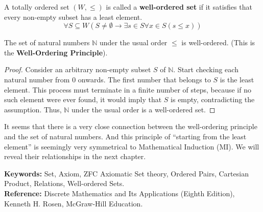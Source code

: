 \begin{definition}
A totally ordered set $(W, \le)$ is called a \textbf{well-ordered set} if it satisfies that every non-empty subset has a least element.
$$ \forall S \subseteq W (S \ne \emptyset \to \exists s \in S \forall x \in S (s \le x)) $$
\end{definition}

\begin{theorem}
The set of natural numbers $\mathbb{N}$ under the usual order $\le$ is well-ordered. (This is the \textbf{Well-Ordering Principle}).
\end{theorem}
\begin{proof}
Consider an arbitrary non-empty subset $S$ of $\mathbb{N}$. Start checking each natural number from 0 onwards. The first number that belongs to $S$ is the least element. This process must terminate in a finite number of steps, because if no such element were ever found, it would imply that $S$ is empty, contradicting the assumption. Thus, $\mathbb{N}$ under the usual order is a well-ordered set.
\end{proof}

It seems that there is a very close connection between the well-ordering principle and the set of natural numbers. And this principle of “starting from the least element” is seemingly very symmetrical to Mathematical Induction (MI). We will reveal their relationships in the next chapter.

\noindent
\textbf{Keywords:} Set, Axiom, ZFC Axiomatic Set theory, Ordered Pairs, Cartesian Product, Relations, Well-ordered Sets. \\
\textbf{Reference:} Discrete Mathematics and Its Applications (Eighth Edition), Kenneth H. Rosen, McGraw-Hill Education.

\cleardoublepage
